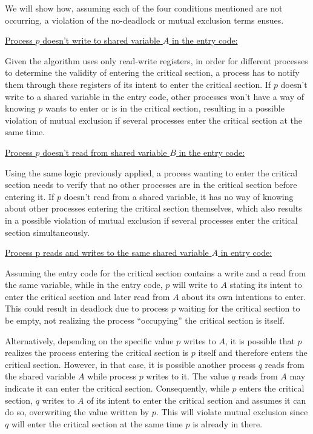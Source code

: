 \documentclass{article}
\begin{document}
We will show how, assuming each of the four conditions mentioned are
not occurring, a violation of the no-deadlock or mutual exclusion
terms ensues.

\uline{Process \mbox{$p$} doesn't write to shared variable \mbox{$A$}
in the entry code:}

Given the algorithm uses only read-write registers, in order for different
processes to determine the validity of entering the critical section,
a process has to notify them through these registers of its intent
to enter the critical section. If $p$ doesn't write to a shared variable
in the entry code, other processes won't have a way of knowing $p$
wants to enter or is in the critical section, resulting in a possible
violation of mutual exclusion if several processes enter the critical
section at the same time.

\uline{Process \mbox{$p$} doesn't read from shared variable \mbox{$B$}
in the entry code:}

Using the same logic previously applied, a process wanting to enter
the critical section needs to verify that no other processes are in
the critical section before entering it. If $p$ doesn't read from
a shared variable, it has no way of knowing about other processes
entering the critical section themselves, which also results in a
possible violation of mutual exclusion if several processes enter
the critical section simultaneously.

\uline{Process p reads and writes to the same shared variable \mbox{$A$}
in entry code:}

Assuming the entry code for the critical section contains a write
and a read from the same variable, while in the entry code, $p$ will
write to $A$ stating its intent to enter the critical section and
later read from $A$ about its own intentions to enter. This could
result in deadlock due to process $p$ waiting for the critical section
to be empty, not realizing the process ``occupying'' the critical
section is itself.

Alternatively, depending on the specific value $p$ writes to $A$,
it is possible that $p$ realizes the process entering the critical
section is $p$ itself and therefore enters the critical section.
However, in that case, it is possible another process $q$ reads from
the shared variable $A$ while process $p$ writes to it. The value
$q$ reads from $A$ may indicate it can enter the critical section.
Consequently, while $p$ enters the critical section, $q$ writes
to $A$ of its intent to enter the critical section and assumes it
can do so, overwriting the value written by $p$. This will violate
mutual exclusion since $q$ will enter the critical section at the
same time $p$ is already in there.
\end{document}
